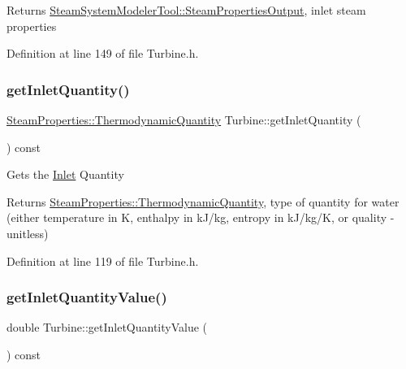 \begin{DoxyReturn}{Returns}
\hyperlink{struct_steam_system_modeler_tool_1_1_steam_properties_output}{Steam\+System\+Modeler\+Tool\+::\+Steam\+Properties\+Output}, inlet steam properties 
\end{DoxyReturn}


Definition at line 149 of file Turbine.\+h.

\mbox{\label{class_turbine_ac9e91d9539cea5cd1e0037c397c28c78}} 
\subsubsection{\texorpdfstring{get\+Inlet\+Quantity()}{getInletQuantity()}}
{\footnotesize\ttfamily \hyperlink{class_steam_properties_ae0294bedf7d178c2d8fb6aed0f62fbff}{Steam\+Properties\+::\+Thermodynamic\+Quantity} Turbine\+::get\+Inlet\+Quantity (\begin{DoxyParamCaption}{ }\end{DoxyParamCaption}) const\hspace{0.3cm}{\ttfamily [inline]}}

Gets the \hyperlink{class_inlet}{Inlet} Quantity

\begin{DoxyReturn}{Returns}
\hyperlink{class_steam_properties_ae0294bedf7d178c2d8fb6aed0f62fbff}{Steam\+Properties\+::\+Thermodynamic\+Quantity}, type of quantity for water (either temperature in K, enthalpy in k\+J/kg, entropy in k\+J/kg/K, or quality -\/ unitless) 
\end{DoxyReturn}


Definition at line 119 of file Turbine.\+h.

\mbox{\label{class_turbine_a3d8a3f317fa71abb3404144371615725}} 
\subsubsection{\texorpdfstring{get\+Inlet\+Quantity\+Value()}{getInletQuantityValue()}}
{\footnotesize\ttfamily double Turbine\+::get\+Inlet\+Quantity\+Value (\begin{DoxyParamCaption}{ }\end{DoxyParamCaption}) const\hspace{0.3cm}{\ttfamily [inline]}}

